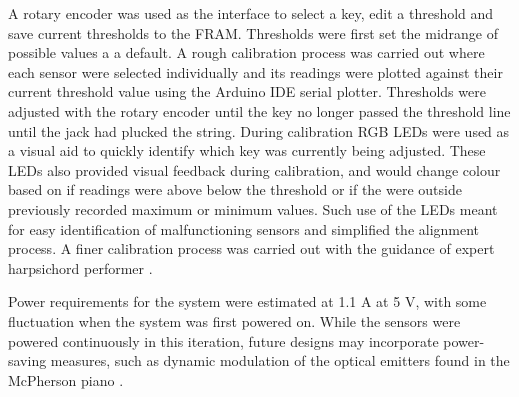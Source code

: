 A rotary encoder was used as the interface to select a key, edit a threshold and save current thresholds to the FRAM.
Thresholds were first set the midrange of possible values a a default. A rough calibration process was carried out where each sensor were selected individually and its readings were plotted against their current threshold value using the Arduino IDE serial plotter. Thresholds were adjusted with the rotary encoder until the key no longer passed the threshold line until the jack had plucked the string. During calibration RGB LEDs were used as a visual aid to quickly identify which key was currently being adjusted. These LEDs also provided visual feedback during calibration, and would change colour based on if readings were above below the threshold or if the were outside previously recorded maximum or minimum values. Such use of the LEDs meant for easy identification of malfunctioning sensors and simplified the alignment process. A finer calibration process was carried out with the guidance of expert harpsichord performer .

Power requirements for the system were estimated at 1.1 A at 5 V, with some fluctuation when the system was first powered on. While the sensors were powered continuously in this iteration, future designs may incorporate power-saving measures, such as dynamic modulation of the optical emitters found in the McPherson piano \cite{McPherson2013}.

